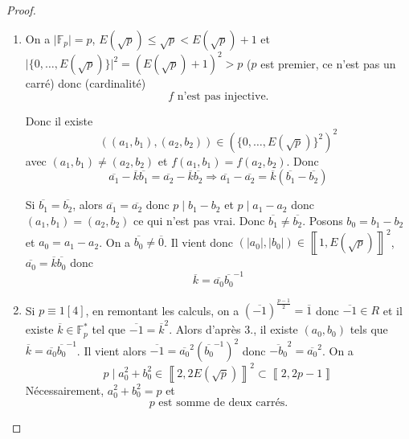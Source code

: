 \documentclass[12pt]{article}
\begin{document}
\begin{proof}
\begin{enumerate}
		\item On a $\vert\mathbb{F}_{p}\vert=p$, $E(\sqrt{p})\leqslant\sqrt{p}<E(\sqrt{p})+1$ et $\vert\{0,\dots,E(\sqrt{p})\}\vert^{2}=(E(\sqrt{p})+1)^{2}>p$ ($p$ est premier, ce n'est pas un carré) donc (cardinalité)
		\begin{equation}
			\boxed{f\text{ n'est pas injective.}}
		\end{equation}
		
		Donc il existe 
		\begin{equation}
			((a_{1},b_{1}),(a_{2},b_{2}))\in(\{0,\dots,E(\sqrt{p})\}^{2})^{2}
		\end{equation} avec $(a_{1},b_{1})\neq (a_{2},b_{2})$ et $f(a_{1},b_{1})=f(a_{2},b_{2})$. Donc 
		\begin{equation}
			\overline{a_{1}}-\overline{k}\overline{b_{1}}=\overline{a_{2}}-\overline{k}\overline{b_{2}}\Rightarrow \overline{a_{1}}-\overline{a_{2}}=\overline{k}(\overline{b_{1}}-\overline{b_{2}})
		\end{equation}
		
		Si $\overline{b_{1}}=\overline{b_{2}}$, alors $\overline{a_{1}}=\overline{a_{2}}$ donc $p\mid b_{1}-b_{2}$ et $p\mid a_{1}-a_{2}$ donc $(a_{1},b_{1})=(a_{2},b_{2})$ ce qui n'est pas vrai. Donc $\overline{b_{1}}\neq\overline{b_{2}}$. Posons $b_{0}=b_{1}-b_{2}$ et $a_{0}=a_{1}-a_{2}$. On a $\overline{b_{0}}\neq\overline{0}$. Il vient donc $(\vert a_{0}\vert,\vert b_{0}\vert)\in\left\llbracket 1,E(\sqrt{p})\right\rrbracket^{2}$, $\overline{a_{0}}=\overline{k}\overline{b_{0}}$ donc 
		\begin{equation}
			\boxed{\overline{k}=\overline{a_{0}}\overline{b_{0}}^{-1}}
		\end{equation}

		\item Si $p\equiv 1[4]$, en remontant les calculs, on a $(\overline{-1})^{\frac{p-1}{2}}=\overline{1}$ donc $\overline{-1}\in R$ et il existe $\overline{k}\in\mathbb{F}_{p}^{*}$ tel que $\overline{-1}=\overline{k}^{2}$. Alors d'après 3., il existe $(a_{0},b_{0})$ tels que $\overline{k}=\overline{a_{0}}\overline{b_{0}}^{-1}$. Il vient alors $\overline{-1}=\overline{a_{0}}^{2}(\overline{b_{0}}^{-1})^{2}$ donc $\overline{-b_{0}}^{2}=\overline{a_{0}}^{2}$. On a 
		\begin{equation}
			p\mid a_{0}^{2}+b_{0}^{2}\in\left\llbracket 2,2E(\sqrt{p})\right\rrbracket^{2}\subset\left\llbracket 2,2p-1\right\rrbracket
		\end{equation}
		Nécessairement, $a_{0}^{2}+b_{0}^{2}=p$ et 
		\begin{equation}
			\boxed{p\text{ est somme de deux carrés.}}
		\end{equation}
	\end{enumerate}
\end{proof}
\end{document}
